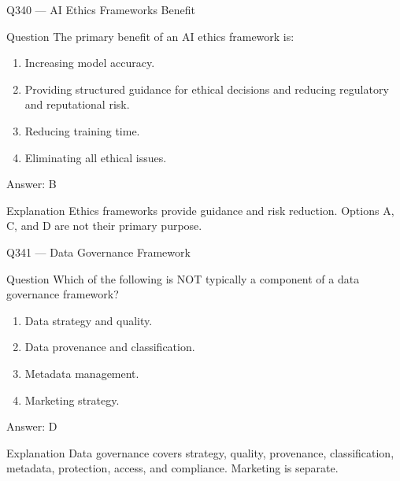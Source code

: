 \documentclass[aspectratio=169,8pt]{beamer}
\begin{document}
\begin{frame}{Q340 --- AI Ethics Frameworks Benefit}
	\begin{block}{Question}
		The primary benefit of an AI ethics framework is:
		\begin{enumerate}
			\item Increasing model accuracy.
			\item Providing structured guidance for ethical decisions and reducing regulatory and reputational risk.
			\item Reducing training time.
			\item Eliminating all ethical issues.
	\end{enumerate}  \end{block}
	\begin{exampleblock}{Answer: B}\end{exampleblock}
	\begin{block}{Explanation}
		Ethics frameworks provide guidance and risk reduction. Options A, C, and D are not their primary purpose.
	\end{block}
\end{frame}


\begin{frame}{Q341 --- Data Governance Framework}
	\begin{block}{Question}
		Which of the following is NOT typically a component of a data governance framework?
		\begin{enumerate}
			\item Data strategy and quality.
			\item Data provenance and classification.
			\item Metadata management.
			\item Marketing strategy.
	\end{enumerate}  \end{block}
	\begin{exampleblock}{Answer: D}\end{exampleblock}
	\begin{block}{Explanation}
		Data governance covers strategy, quality, provenance, classification, metadata, protection, access, and compliance. Marketing is separate.
	\end{block}
\end{frame}
\end{document}
